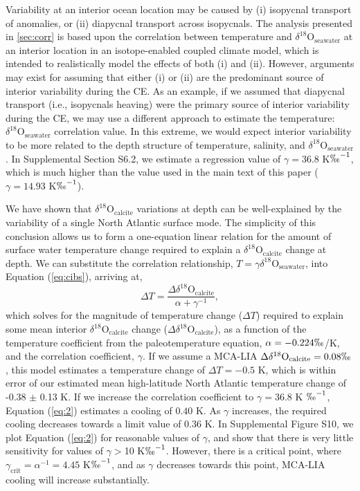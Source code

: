\documentclass[draft]{agujournal2019}
\begin{document}
Variability at an interior ocean location may be caused by (i)
isopycnal transport of anomalies, or (ii) diapycnal transport across
isopycnals. The analysis presented in \ref{sec:corr} is based upon the
correlation between temperature and
$\delta^{18}\mathrm{O}_{\mathrm{seawater}}$ at an interior location in an
isotope-enabled coupled climate model, which is intended to
realistically model the effects of both (i) and (ii). However,
arguments may exist for assuming that either (i) or (ii) are the
predominant source of interior variability during the CE. As an
example, if we assumed that diapycnal transport (i.e., isopycnals
heaving) were the primary source of interior variability during the
CE, we may use a different approach to estimate the
temperature:$\delta^{18}\mathrm{O}_{\mathrm{seawater}}$ correlation
value. In this extreme, we would expect interior variability to be
more related to the depth structure of temperature, salinity, and
$\delta^{18}\mathrm{O}_{\mathrm{seawater}}$. In Supplemental Section
S6.2, %
we estimate a regression value of
$\gamma = 36.8$ K$\permil^{-1}$, which is much higher than the value used
in the main text of this paper ($\gamma = 14.93$ K$\permil^{-1}$).

We have shown that $\delta^{18}\mathrm{O}_{\mathrm{calcite}}$ variations at
depth can be well-explained by the variability of a single North
Atlantic surface mode. The simplicity of this conclusion allows us to
form a one-equation linear relation for the amount of surface water
temperature change required to explain a
$\delta^{18}\mathrm{O}_{\mathrm{calcite}}$ change at depth. We can
substitute the correlation relationship,
$T = \gamma \delta^{18}\mathrm{O}_{\mathrm{seawater}}$, into Equation (\ref{eq:cibs}), arriving at,
\begin{equation}
\label{eq:2}
\Delta T = \frac{\Delta \delta^{18}\mathrm{O}_{\mathrm{calcite}}}{\alpha + \gamma^{-1}},
\end{equation}
which solves for the magnitude of temperature change ($\Delta T$) required
to explain some mean interior $\delta^{18}\mathrm{O}_{\mathrm{calcite}}$ change
($\Delta \delta^{18}\mathrm{O}_{\mathrm{calcite}}$), as a function of the
temperature coefficient from the paleotemperature equation,
$\alpha = -0.224 \permil$/K, and the correlation coefficient,
$\gamma$. If we assume a MCA-LIA
$\Delta \delta^{18}\mathrm{O}_{\mathrm{calcite}} = 0.08 \permil$, this model
estimates a temperature change of $\Delta T = -0.5$ K, which is within error of
our estimated mean high-latitude North Atlantic temperature change of -0.38 $\pm$ 0.13
K. If we increase the correlation coefficient to $\gamma = 36.8$ K
$\permil^{-1}$, Equation (\ref{eq:2}) estimates a cooling of $0.40$ K.
As $\gamma$ increases, the required cooling decreases
towards a limit value of $0.36$ K. In Supplemental Figure
S10, %
we plot Equation (\ref{eq:2}) for reasonable
values of $\gamma$, and show that there is very little sensitivity for
values of $\gamma >$10 K$\permil^{-1}$. However, there is a critical point,
where $\gamma_{\mathrm{crit}} = \alpha^{-1} = 4.45$ K$\permil^{-1}$, and as
$\gamma$ decreases towards this point, MCA-LIA cooling will increase
substantially.
\end{document}
